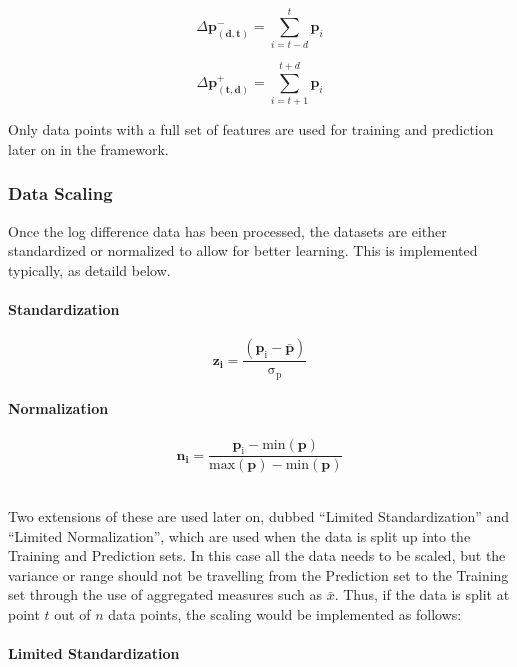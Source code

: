 \documentclass[a4paper,11pt,oneside]{article}
\theoremstyle{plain}
\theoremstyle{definition}
\begin{document}
\begin{equation}
\Delta \mathbf{p^{-}_{(d,t)}} = \sum_{i = t-d}^{t} \mathbf{p}_i
\end{equation}

\begin{equation}
\Delta \mathbf{p^{+}_{(t,d)}} = \sum_{i = t+1}^{t+d} \mathbf{p}_i
\end{equation}

Only data points with a full set of features are used for training and prediction later on in the framework.

\subsubsection{Data Scaling}\label{data_scaling}
Once the log difference data has been processed, the datasets are either standardized or normalized to allow for better learning. This is implemented typically, as detaild below.

\paragraph{Standardization}
\begin{equation}
\mathbf{z_i}= \mathrm{\frac{(\mathbf{p}_i - \mathbf{\bar{p}}) }{\sigma_p}}
\end{equation}

\paragraph{Normalization}

\begin{equation}\label{eq_ltd_normalization}
\mathbf{n_i}= \frac{\mathrm{\mathbf{p}_i - min(\mathbf{p}) }}{\mathrm{max(\mathbf{p}) -{min}(\mathbf{p})}}
\end{equation}

~\\
Two extensions of these are used later on, dubbed ``Limited Standardization'' and ``Limited Normalization'', which are used when the data is split up into the Training and Prediction sets. In this case all the data needs to be scaled, but the variance or range should not be travelling from the Prediction set to the Training set through the use of aggregated measures such as $\bar{x}$. Thus, if the data is split at point $t$ out of $n$ data points, the scaling would be implemented as follows:

\paragraph{Limited Standardization}
\end{document}
